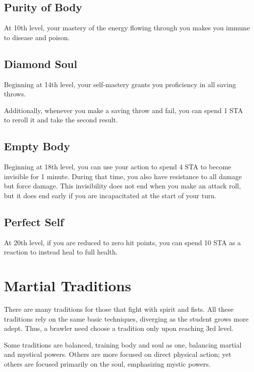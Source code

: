 \subsection{Purity of Body}

At 10th level, your mastery of the energy flowing through you makes you immune to disease and poison.

\subsection{Diamond Soul}

Beginning at 14th level, your self-mastery grants you proficiency in all saving throws.

Additionally, whenever you make a saving throw and fail, you can spend 1 STA to reroll it and take the second result.

\subsection{Empty Body}

Beginning at 18th level, you can use your action to spend 4 STA to become invisible for 1 minute. During that time, you also have resistance to all damage but force damage. This invisibility does not end when you make an attack roll, but it does end early if you are incapacitated at the start of your turn.

\subsection{Perfect Self}

At 20th level, if you are reduced to zero hit points, you can spend 10 STA as a reaction to instead heal to full health.

\section{Martial Traditions}

There are many traditions for those that fight with spirit and fists. All these traditions rely on the same basic techniques, diverging as the student grows more adept. Thus, a brawler need choose a tradition only upon reaching 3rd level.

Some traditions are balanced, training body and soul as one, balancing martial and mystical powers. Others are more focused on direct physical action; yet others are focused primarily on the soul, emphasizing mystic powers.

